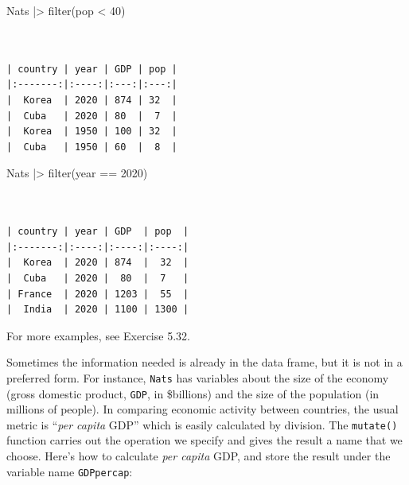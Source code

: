 \documentclass[
  letterpaper,
  DIV=11,
  numbers=noendperiod,
  oneside]{scrartcl}
\newenvironment{Shaded}{\begin{snugshade}}{\end{snugshade}}
\newcommand{\DecValTok}[1]{\textcolor[rgb]{0.68,0.00,0.00}{#1}}
\newcommand{\FunctionTok}[1]{\textcolor[rgb]{0.28,0.35,0.67}{#1}}
\newcommand{\NormalTok}[1]{\textcolor[rgb]{0.00,0.23,0.31}{#1}}
\newcommand{\SpecialCharTok}[1]{\textcolor[rgb]{0.37,0.37,0.37}{#1}}
\begin{document}
\begin{Shaded}
\begin{Highlighting}[]
\NormalTok{Nats }\SpecialCharTok{|\textgreater{}} \FunctionTok{filter}\NormalTok{(pop }\SpecialCharTok{\textless{}} \DecValTok{40}\NormalTok{)}
\end{Highlighting}
\end{Shaded}

\begin{verbatim}


| country | year | GDP | pop |
|:-------:|:----:|:---:|:---:|
|  Korea  | 2020 | 874 | 32  |
|  Cuba   | 2020 | 80  |  7  |
|  Korea  | 1950 | 100 | 32  |
|  Cuba   | 1950 | 60  |  8  |
\end{verbatim}

\begin{Shaded}
\begin{Highlighting}[]
\NormalTok{Nats }\SpecialCharTok{|\textgreater{}} \FunctionTok{filter}\NormalTok{(year }\SpecialCharTok{==} \DecValTok{2020}\NormalTok{)}
\end{Highlighting}
\end{Shaded}

\begin{verbatim}


| country | year | GDP  | pop  |
|:-------:|:----:|:----:|:----:|
|  Korea  | 2020 | 874  |  32  |
|  Cuba   | 2020 |  80  |  7   |
| France  | 2020 | 1203 |  55  |
|  India  | 2020 | 1100 | 1300 |
\end{verbatim}

For more examples, see Exercise 5.32.

\begin{tcolorbox}[enhanced jigsaw, colbacktitle=quarto-callout-note-color!10!white, opacityback=0, breakable, opacitybacktitle=0.6, colback=white, coltitle=black, arc=.35mm, title={3. mutate()}, left=2mm, colframe=quarto-callout-note-color-frame, rightrule=.15mm, bottomrule=.15mm, leftrule=.75mm, bottomtitle=1mm, toptitle=1mm, titlerule=0mm, toprule=.15mm]

\end{tcolorbox}

Sometimes the information needed is already in the data frame, but it is
not in a preferred form. For instance, \texttt{Nats} has variables about
the size of the economy (gross domestic product, \texttt{GDP}, in
\$billions) and the size of the population (in millions of people). In
comparing economic activity between countries, the usual metric is
``\emph{per capita} GDP'' which is easily calculated by division. The
\texttt{mutate()} function carries out the operation we specify and
gives the result a name that we choose. Here's how to calculate
\emph{per capita} GDP, and store the result under the variable name
\texttt{GDPpercap}:
\end{document}
